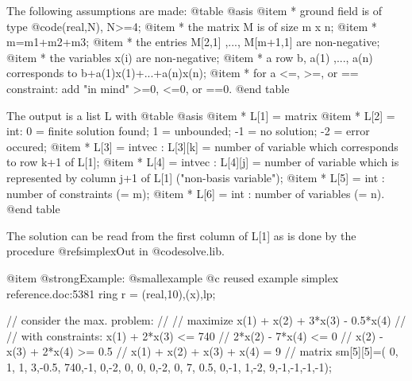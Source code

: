 {{{{{{The following assumptions are made: 
@table @asis
@item   * ground field is of type @code{(real,N)}, N>=4; 
@item   * the matrix M is of size m x n; 
@item   * m=m1+m2+m3;
@item   * the entries M[2,1] ,..., M[m+1,1] are non-negative;
@item   * the variables x(i) are non-negative;
@item   * a row  b, a(1) ,..., a(n)  corresponds to  b+a(1)x(1)+...+a(n)x(n);
@item   * for a <=, >=, or == constraint: add "in mind" >=0, <=0, or ==0.
@end table   

The output is a list L with 
@table @asis
@item * L[1] = matrix
@item * L[2] = int: 
    0 = finite solution found;  1 = unbounded;  -1 = no solution;  
   -2 = error occured;
@item * L[3] = intvec :  
   L[3][k] = number of variable which corresponds to row k+1 of L[1];             
@item * L[4] = intvec :  
   L[4][j] = number of variable which is represented by column j+1 of L[1] 
   ("non-basis variable");
@item * L[5] = int :  
   number of constraints (= m);
@item * L[6] = int :  
   number of variables (= n).
@end table

The solution can be read from the first column of L[1] as is done by the 
procedure @ref{simplexOut} in @code{solve.lib}. 

@item @strong{Example:}
@smallexample
@c reused example simplex reference.doc:5381 
    ring r = (real,10),(x),lp;

    // consider the max. problem:
    //
    //    maximize  x(1) + x(2) + 3*x(3) - 0.5*x(4)
    //
    //  with constraints:   x(1) +          2*x(3)          <= 740
    //                             2*x(2)          - 7*x(4) <=   0
    //                               x(2) -   x(3) + 2*x(4) >=   0.5
    //                      x(1) +   x(2) +   x(3) +   x(4)  =   9
    //
    matrix sm[5][5]=(  0, 1, 1, 3,-0.5,
                     740,-1, 0,-2, 0,
                       0, 0,-2, 0, 7,
                     0.5, 0,-1, 1,-2,
                       9,-1,-1,-1,-1);

}}}}}}
